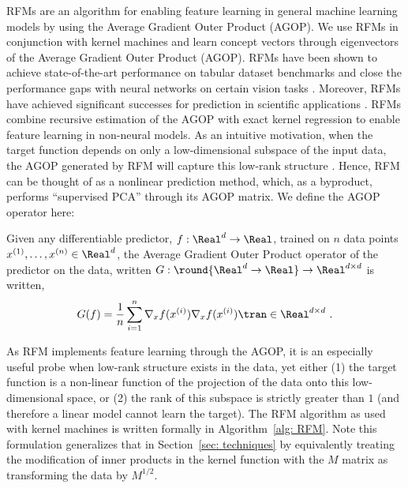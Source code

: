 RFMs are an algorithm for enabling feature learning in general machine learning models by using the Average Gradient Outer Product (AGOP). We use RFMs in conjunction with kernel machines and learn concept vectors through eigenvectors of the Average Gradient Outer Product (AGOP). RFMs have been shown to achieve state-of-the-art performance on tabular dataset benchmarks and close the performance gaps with neural networks on certain vision tasks \cite{rfm_science}. Moreover, RFMs have achieved significant successes for prediction in scientific applications \citep{wu2024inverse, aristoff2024fast, shen2024interpretableqsprmodelingusing}. RFMs combine recursive estimation of the AGOP with exact kernel regression to enable feature learning in non-neural models. As an intuitive motivation, when the target function depends on only a low-dimensional subspace of the input data, the AGOP generated by RFM will capture this low-rank structure \citep{rfm_science}. Hence, RFM can be thought of as a nonlinear prediction method, which, as a byproduct, performs ``supervised PCA'' through its AGOP matrix. We define the AGOP operator here:
\begin{definition} Given any differentiable predictor, $f: \Real^d \rightarrow \Real$, trained on $n$ data points $x^{(1)}, \ldots, x^{(n)} \in \Real^d$, the Average Gradient Outer Product operator of the predictor on the data, written $G: \round{\Real^d \rightarrow \Real} \rightarrow \Real^{d \times d}$ is written,
\begin{align}
G(f) = \frac{1}{n}\sum_{i=1}^n \nabla_x f(x^{(i)}) \nabla_x f(x^{(i)})\tran \in \Real^{d \times d}~.
\end{align}
\end{definition}
As RFM implements feature learning through the AGOP, it is an especially useful probe when low-rank structure exists in the data, yet either (1) the target function is a non-linear function of the projection of the data onto this low-dimensional space, or (2) the rank of this subspace is strictly greater than $1$ (and therefore a linear model cannot learn the target). The RFM algorithm as used with kernel machines is written formally in Algorithm~\ref{alg: RFM}. Note this formulation generalizes that in Section~\ref{sec: techniques} by equivalently treating the modification of inner products in the kernel function with the $M$ matrix as transforming the data by $M^{1/2}$.

